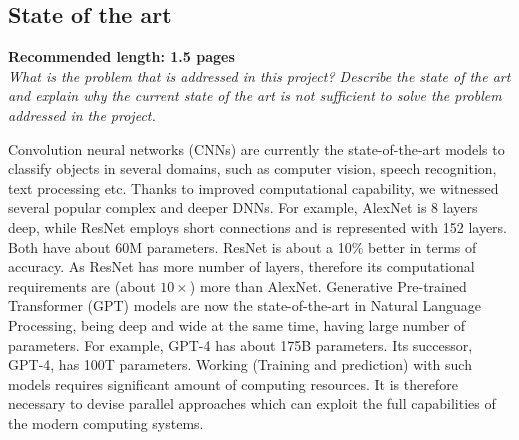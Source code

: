 
\subsection*{State of the art}
\textbf{Recommended length: 1.5 pages}\\

\textit{What is the problem that is addressed in this project? Describe the state of the art and explain why the current state of the art is not sufficient to solve the problem addressed in the project.} 




Convolution neural networks  (CNNs) are currently the state-of-the-art models to classify objects in several domains, such as computer vision, speech recognition, text processing etc. Thanks to improved computational capability, we witnessed several popular complex and deeper DNNs. For example, AlexNet is 8 layers deep, while ResNet employs short connections and is represented with 152 layers. Both have about 60M parameters. ResNet is about a 10\% better in terms of accuracy. As  ResNet has more number of layers, therefore its computational requirements are (about $10\times$) more than AlexNet. Generative Pre-trained Transformer (GPT) models are now the state-of-the-art in Natural Language Processing, being deep and wide at the same time, having large number of parameters. For  example, GPT-4 has about 175B parameters. Its successor, GPT-4, has 100T parameters. Working (Training and prediction) with such models requires significant amount of computing resources. It is therefore necessary to devise parallel approaches which can exploit the full capabilities of the modern computing systems.    



